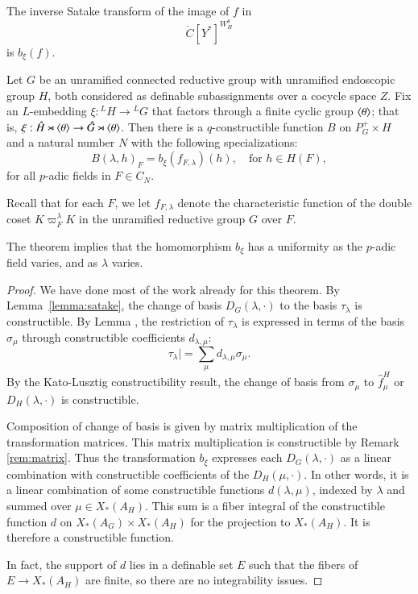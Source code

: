 The inverse Satake transform of the image of $f$ in
\[
\ring{C}[Y^*]^{W_H^\theta}
\]
is $b_\xi(f)$.

\begin{theorem}\label{thm:B}
Let $G$ be an unramified connected reductive group with unramified endoscopic group $H$, both considered as definable
subassignments over a cocycle space $Z$.  Fix an $L$-embedding $\xi:{}^LH\to {}^LG$ that factors through a finite
cyclic group $\langle{\theta}\rangle$; that is, $\xi:\hat H\rtimes \langle{\theta}\rangle \to \hat G \rtimes \langle{\theta}\rangle$.
Then
there is a $q$-constructible function $B$ on $P^+_G\times H$ and a natural number $N$ with the following specializations:
\[
B(\lambda,h)_F = b_\xi(f_{F,\lambda})(h),\quad \text{for } h\in H(F),
\]
for all $p$-adic fields in $F\in C_N$.  
\end{theorem}

Recall that for each $F$, we let  $f_{F,\lambda}$ denote the characteristic function
of the double coset $K\varpi_F^\lambda K$ in the unramified reductive group $G$ over $F$.

The theorem implies that the homomorphism $b_\xi$ has a uniformity as the $p$-adic field
varies, and as $\lambda$ varies.  

\begin{proof}
We have done most of the work already for this theorem.
By Lemma~\ref{lemma:satake}, the change of basis $D_G(\lambda,\cdot)$ to the basis $\tau_\lambda$
is constructible.  
By Lemma , 
the restriction of $\tau_\lambda$ is expressed in terms of the basis $\sigma_\mu$ through
constructible coefficients $d_{\lambda,\mu}$:
\[
\tau_\lambda| = \sum_{\mu} d_{\lambda,\mu} \sigma_\mu.
\]
By the Kato-Lusztig constructibility result, the change of basis from 
$\sigma_\mu$ to $\hat f^H_\mu$ or $D_H(\lambda,\cdot)$ is constructible.  

Composition of change of basis is given by matrix multiplication of the transformation matrices.
This matrix multiplication is constructible by Remark \ref{rem:matrix}.  Thus the transformation $b_\xi$
expresses each $D_G(\lambda,\cdot)$ as a linear combination with constructible coefficients
of the $D_H(\mu,\cdot)$.   In other words, it is a linear combination of some constructible functions
$d(\lambda,\mu)$, indexed by $\lambda$ and summed over $\mu\in X_*(A_H)$.  This sum
is a fiber integral of the constructible function $d$ on $X_*(A_G)\times X_*(A_H)$ for the
projection to $X_*(A_H)$.  It is therefore a constructible function.

In fact, the support of $d$ lies in a definable set $E$ such that the fibers of $E\to X_*(A_H)$
are finite, so there are no integrability issues.
\end{proof}


